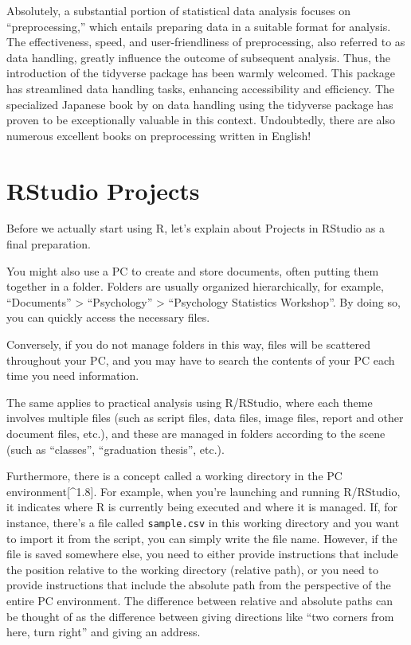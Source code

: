 \documentclass[
  a4paper,
]{book}
\begin{document}
Absolutely, a substantial portion of statistical data analysis focuses
on ``preprocessing,'' which entails preparing data in a suitable format
for analysis. The effectiveness, speed, and user-friendliness of
preprocessing, also referred to as data handling, greatly influence the
outcome of subsequent analysis. Thus, the introduction of the tidyverse
package has been warmly welcomed. This package has streamlined data
handling tasks, enhancing accessibility and efficiency. The specialized
Japanese book by \textcite{Kinosady2021} on data handling using the
tidyverse package has proven to be exceptionally valuable in this
context. Undoubtedly, there are also numerous excellent books on
preprocessing written in English!

\section{RStudio Projects}\label{rstudio-projects}

Before we actually start using R, let's explain about Projects in
RStudio as a final preparation.

You might also use a PC to create and store documents, often putting
them together in a folder. Folders are usually organized hierarchically,
for example, ``Documents'' \textgreater{} ``Psychology'' \textgreater{}
``Psychology Statistics Workshop''. By doing so, you can quickly access
the necessary files.

Conversely, if you do not manage folders in this way, files will be
scattered throughout your PC, and you may have to search the contents of
your PC each time you need information.

The same applies to practical analysis using R/RStudio, where each theme
involves multiple files (such as script files, data files, image files,
report and other document files, etc.), and these are managed in folders
according to the scene (such as ``classes'', ``graduation thesis'',
etc.).

Furthermore, there is a concept called a working directory in the PC
environment{[}\^{}1.8{]}. For example, when you're launching and running
R/RStudio, it indicates where R is currently being executed and where it
is managed. If, for instance, there's a file called \texttt{sample.csv}
in this working directory and you want to import it from the script, you
can simply write the file name. However, if the file is saved somewhere
else, you need to either provide instructions that include the position
relative to the working directory (relative path), or you need to
provide instructions that include the absolute path from the perspective
of the entire PC environment. The difference between relative and
absolute paths can be thought of as the difference between giving
directions like ``two corners from here, turn right'' and giving an
address.
\end{document}
